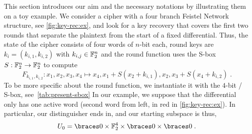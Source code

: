 This section introduces our aim and the necessary notations by illustrating them on a toy example.
We consider a cipher with a four branch Feistel Network structure, see \cref{fig:key-rec:ex}, and look for a key recovery that covers the first two rounds that separate the plaintext from the start of a fixed differential.
Thus, the state of the cipher consists of four words of $n$-bit each, round keys are $k_i = (k_{i,1}, k_{i,2})$ with $k_{i,j} \in \mathbb{F}_2^n$ and the round function uses the S-box $S : \mathbb{F}_2^n \to \mathbb{F}_2^n$ to compute
\begin{equation*}
    F_{k_{i,1}, k_{i,2}} : x_1, x_2, x_3, x_4 \mapsto x_4, x_1 + S(x_2 + k_{i,1}), x_2, x_3 + S(x_4 + k_{i,2})\;.
\end{equation*}
To be more specific about the round function, we instantiate it with the $4$-bit \present/ S-box, see~\cref{tab:present-sbox}
In our example, we suppose that the differential only has one active word (second word from left, in red in \cref{fig:key-rec:ex}).
In particular, our distinguisher ends in, and our starting subspace is thus,
\begin{equation*}
    U_0 = \set{0} \times \F_2^4 \times \set{0} \times \set{0}\;.
\end{equation*}

